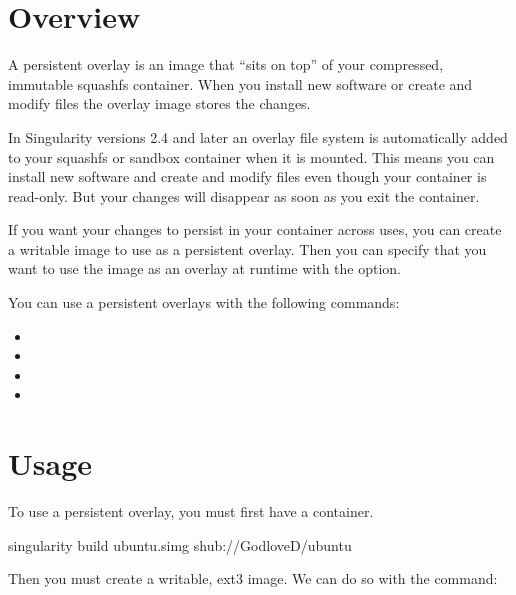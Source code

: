 \documentclass[letterpaper,10pt,english]{sphinxmanual}
\begin{document}
\section{Overview}
\label{\detokenize{persistent_overlays:overview}}
A persistent overlay is an image that “sits on top” of your
compressed, immutable squashfs container. When you install new
software or create and modify files the overlay image stores the
changes.

In Singularity versions 2.4 and later an overlay file system is
automatically added to your squashfs or sandbox container when it is
mounted. This means you can install new software and create and modify
files even though your container is read-only. But your changes will disappear as soon as you exit the container.

If you want your changes to persist in your container across uses, you
can create a writable image to use as a persistent overlay. Then you
can specify that you want to use the image as an overlay at runtime
with the  option.

You can use a persistent overlays with the following commands:
\begin{itemize}
\item {} 

\item {} 

\item {} 

\item {} 

\end{itemize}


\section{Usage}
\label{\detokenize{persistent_overlays:usage}}
To use a persistent overlay, you must first have a container.

%
\begin{sphinxVerbatim}[commandchars=\\\{\}]
\PYGZdl{} singularity build ubuntu.simg shub://GodloveD/ubuntu
\end{sphinxVerbatim}

Then you must create a writable, ext3 image. We can do so with the 
command:
\end{document}

